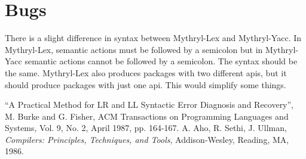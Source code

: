 \section{Bugs}

There is a slight difference in syntax between Mythryl-Lex and Mythryl-Yacc.
In Mythryl-Lex, semantic actions must be followed by a semicolon but
in Mythryl-Yacc semantic actions cannot be followed by a semicolon.
The syntax should be the same.  Mythryl-Lex also produces packages with
two different apis, but it should produce packages with just
one api.  This would simplify some things.

\begin{thebibliography}{9}

 ``A Practical Method for LR and LL Syntactic Error
Diagnosis and Recovery'', M. Burke and G. Fisher,
ACM Transactions on Programming Languages and
Systems, Vol. 9, No. 2, April 1987, pp. 164-167.
 A. Aho, R. Sethi, J. Ullman, {\em Compilers: Principles,
Techniques, and Tools}, Addison-Wesley, Reading, MA, 1986.

\end{thebibliography}


